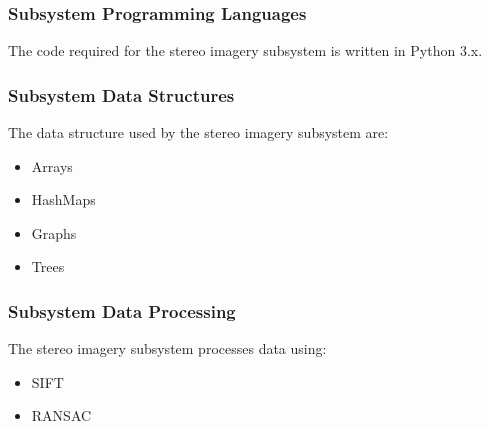 \subsubsection{Subsystem Programming Languages}
The code required for the stereo imagery subsystem is written in Python 3.x.

\subsubsection{Subsystem Data Structures}
The data structure used by the stereo imagery subsystem are:
\begin{itemize}
    \item Arrays
    \item HashMaps
    \item Graphs
    \item Trees
\end{itemize}

\subsubsection{Subsystem Data Processing}
The stereo imagery subsystem processes data using:
\begin{itemize}
    \item SIFT
    \item RANSAC
\end{itemize}
